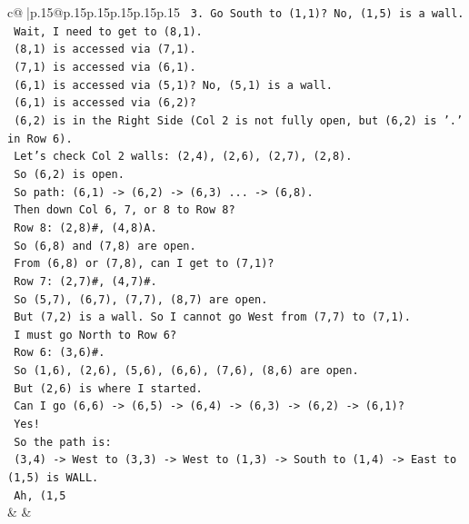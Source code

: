 \documentclass{article}
\begin{document}
{\begin{supertabular}{c@{$\;$}|p{.15\linewidth}@{}p{.15\linewidth}p{.15\linewidth}p{.15\linewidth}p{.15\linewidth}p{.15\linewidth}}
{{{\texttt{   3. Go South to (1,1)? No, (1,5) is a wall.} \\
\texttt{      Wait, I need to get to (8,1).} \\
\texttt{      (8,1) is accessed via (7,1).} \\
\texttt{      (7,1) is accessed via (6,1).} \\
\texttt{      (6,1) is accessed via (5,1)? No, (5,1) is a wall.} \\
\texttt{      (6,1) is accessed via (6,2)?} \\
\texttt{      (6,2) is in the Right Side (Col 2 is not fully open, but (6,2) is '.' in Row 6).} \\
\texttt{      Let's check Col 2 walls: (2,4), (2,6), (2,7), (2,8).} \\
\texttt{      So (6,2) is open.} \\
\texttt{      So path: (6,1) {-}> (6,2) {-}> (6,3) ... {-}> (6,8).} \\
\texttt{      Then down Col 6, 7, or 8 to Row 8?} \\
\texttt{      Row 8: (2,8)\#, (4,8)A.} \\
\texttt{      So (6,8) and (7,8) are open.} \\
\texttt{      From (6,8) or (7,8), can I get to (7,1)?} \\
\texttt{      Row 7: (2,7)\#, (4,7)\#.} \\
\texttt{      So (5,7), (6,7), (7,7), (8,7) are open.} \\
\texttt{      But (7,2) is a wall. So I cannot go West from (7,7) to (7,1).} \\
\texttt{      I must go North to Row 6?} \\
\texttt{      Row 6: (3,6)\#.} \\
\texttt{      So (1,6), (2,6), (5,6), (6,6), (7,6), (8,6) are open.} \\
\texttt{      But (2,6) is where I started.} \\
\texttt{      Can I go (6,6) {-}> (6,5) {-}> (6,4) {-}> (6,3) {-}> (6,2) {-}> (6,1)?} \\
\texttt{      Yes!} \\
\texttt{      So the path is:} \\
\texttt{      (3,4) {-}> West to (3,3) {-}> West to (1,3) {-}> South to (1,4) {-}> East to (1,5) is WALL.} \\
\texttt{      Ah, (1,5} \\
            }
        }
    }
    & & \\ \\


\end{supertabular}}
\end{document}

